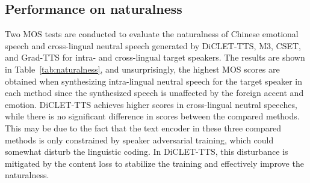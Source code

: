 \documentclass[journal,comsoc]{IEEEtran}
\begin{document}
\subsection{Performance on naturalness}

Two MOS tests are conducted to evaluate the naturalness of Chinese emotional speech and cross-lingual neutral speech generated by DiCLET-TTS, M3, CSET, and Grad-TTS for intra- and cross-lingual target speakers.
The results are shown in Table~\ref{tab:naturalness}, and unsurprisingly, the highest MOS scores are obtained when synthesizing intra-lingual neutral speech for the target speaker in each method since the synthesized speech is unaffected by the foreign accent and emotion.
DiCLET-TTS achieves higher scores in cross-lingual neutral speeches, while there is no significant difference in scores between the compared methods. 
This may be due to the fact that the text encoder in these three compared methods is only constrained by speaker adversarial training, which could somewhat disturb the linguistic coding.
In DiCLET-TTS, this disturbance is mitigated by the content loss to stabilize the training and effectively improve the naturalness.
\end{document}
